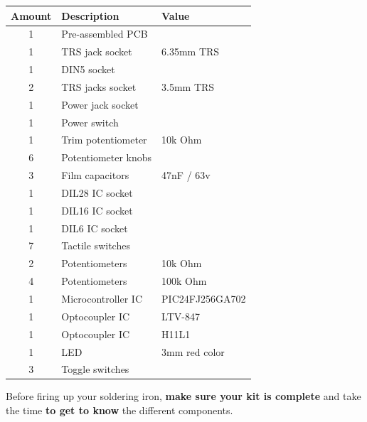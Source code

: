 \documentclass{scrartcl}
\begin{document}
\begin{center}
    \begin{tabular}{|c|l|l|}
        \hline
        \textbf{Amount} & \textbf{Description} & \textbf{Value}  \\
        \hline
        1               & Pre-assembled PCB    &                 \\
        1               & TRS jack socket      & 6.35mm TRS      \\
        1               & DIN5 socket          &                 \\
        2               & TRS jacks socket     & 3.5mm TRS       \\
        1               & Power jack socket    &                 \\
        1               & Power switch         &                 \\
        1               & Trim potentiometer   & 10k Ohm         \\
        6               & Potentiometer knobs  &                 \\
        3               & Film capacitors      & 47nF / 63v      \\
        1               & DIL28 IC socket      &                 \\
        1               & DIL16 IC socket      &                 \\
        1               & DIL6 IC socket       &                 \\
        7               & Tactile switches     &                 \\
        2               & Potentiometers       & 10k Ohm         \\
        4               & Potentiometers       & 100k Ohm        \\
        1               & Microcontroller IC   & PIC24FJ256GA702 \\
        1               & Optocoupler IC       & LTV-847         \\
        1               & Optocoupler IC       & H11L1           \\
        1               & LED                  & 3mm red color   \\
        3               & Toggle switches      &                 \\
        \hline
    \end{tabular}
\end{center}

\vspace{0.5cm}
Before firing up your soldering iron, \textbf{make sure your kit is complete} and take the time \textbf{to get to know} the different components.
\end{document}
